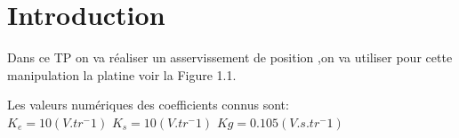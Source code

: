 \chapter*{Introduction}Dans ce TP on va réaliser un asservissement de position ,on va utiliser pour cette manipulation la platine voir   la Figure 1.1.



Les valeurs numériques des coefficients connus sont:\\

 $K_e=10(V.tr^-1)$	 \hfill		$K_s=10(V.tr^-1)$	\hfill		$Kg=0.105(V.s.tr^-1)$ 